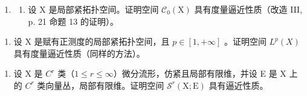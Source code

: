 \begin{enumerate}
\def\labelenumi{\arabic{enumi})}
\setcounter{enumi}{35}
\tightlist
\item
  \begin{enumerate}
  \def\labelenumii{\alph{enumii})}
  \tightlist
  \item
    设 X 是局部紧拓扑空间。证明空间 \(\mathcal{C}_{0}(\mathrm{X})\) 具有度量逼近性质（改造 III, p. 21 命题 13 的证明）。
  \end{enumerate}
\end{enumerate}

\begin{enumerate}
\def\labelenumi{\alph{enumi})}
\setcounter{enumi}{1}
\tightlist
\item
  设 X 是赋有正测度的局部紧拓扑空间，且 \(p \in [1, +\infty]\) 。证明空间 \(L^{p}(X)\) 具有度量逼近性质（同样的方法）。
\end{enumerate}

\begin{enumerate}
\def\labelenumi{\arabic{enumi})}
\setcounter{enumi}{36}
\tightlist
\item
  设 X 是 \(C^{r}\) 类（\(1 \leqslant r \leqslant \infty\)）微分流形，仿紧且局部有限维，并设 E 是 X 上的 \(C^{r}\) 类向量丛，局部有限维。证明空间 \(\mathcal{S}^{r}(\mathrm{X};\mathrm{E})\) 具有逼近性质。
\end{enumerate}

